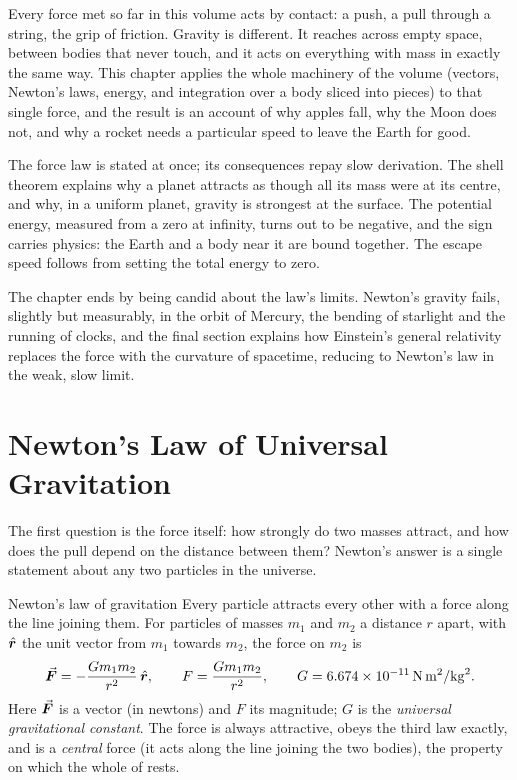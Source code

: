 

Every force met so far in this volume acts by contact: a push, a pull through a string, the grip of
friction. Gravity is different. It reaches across empty space, between bodies that never touch, and it
acts on everything with mass in exactly the same way. This chapter applies the whole machinery of the
volume (vectors, Newton's laws, energy, and integration over a body sliced into pieces) to that single
force, and the result is an account of why apples fall, why the Moon does not, and why a rocket needs a
particular speed to leave the Earth for good.

The force law is stated at once; its consequences repay slow derivation. The shell theorem explains why a
planet attracts as though all its mass were at its centre, and why, in a uniform planet, gravity is
strongest at the surface. The potential energy, measured from a zero at infinity, turns out to be
negative, and the sign carries physics: the Earth and a body near it are bound together. The escape speed
follows from setting the total energy to zero.

The chapter ends by being candid about the law's limits. Newton's gravity fails, slightly but measurably,
in the orbit of Mercury, the bending of starlight and the running of clocks, and the final section
explains how Einstein's general relativity replaces the force with the curvature of spacetime, reducing
to Newton's law in the weak, slow limit.

\section{Newton's Law of Universal Gravitation}\label{sec:newtonlaw}

The first question is the force itself: how strongly do two masses attract, and how does the pull
depend on the distance between them? Newton's answer is a single statement about any two particles in
the universe.

\begin{keybox}{Newton's law of gravitation}
Every particle attracts every other with a force along the line joining them. For particles of masses
$m_1$ and $m_2$ a distance $r$ apart, with $\hat{\bm{r}}$ the unit vector from $m_1$ towards $m_2$, the force
on $m_2$ is
\[
\vec{\bm{F}}=-\frac{Gm_1m_2}{r^2}\,\hat{\bm{r}},\qquad F=\frac{Gm_1m_2}{r^2},\qquad G=\SI{6.674e-11}{N.m^2/kg^2}.
\]
Here $\vec{\bm{F}}$ is a vector (in newtons) and $F$ its magnitude; $G$ is the \emph{universal gravitational
constant}. The force is always attractive, obeys the third law exactly, and is a \emph{central} force
(it acts along the line joining the two bodies), the property on which the whole of  rests.
\end{keybox}

